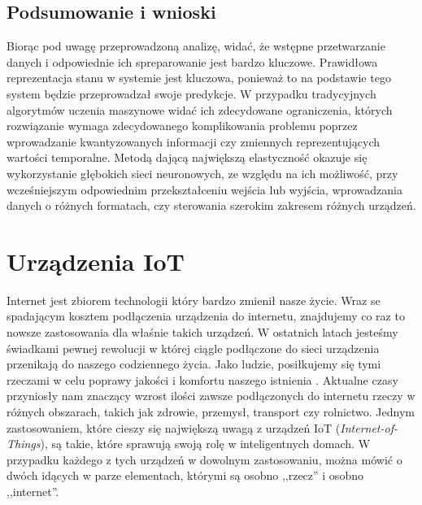 \subsection{Podsumowanie i wnioski}
Biorąc pod uwagę przeprowadzoną analizę, widać, że wstępne przetwarzanie danych i odpowiednie ich spreparowanie jest bardzo kluczowe. Prawidłowa reprezentacja stanu w systemie jest kluczowa, ponieważ to na podstawie tego system będzie przeprowadzał swoje predykcje. W przypadku tradycyjnych algorytmów uczenia maszynowe widać ich zdecydowane ograniczenia, których rozwiązanie wymaga zdecydowanego komplikowania problemu poprzez wprowadzanie kwantyzowanych informacji czy zmiennych reprezentujących wartości temporalne. Metodą dającą największą elastyczność okazuje się wykorzystanie głębokich sieci neuronowych, ze względu na ich możliwość, przy wcześniejszym odpowiednim przekształceniu wejścia lub wyjścia, wprowadzania danych o różnych formatach, czy sterowania szerokim zakresem różnych urządzeń.

\section{Urządzenia IoT}



Internet jest zbiorem technologii który bardzo zmienił nasze życie. Wraz se spadającym kosztem podłączenia urządzenia do internetu, znajdujemy co raz to nowsze zastosowania dla właśnie takich urządzeń. W ostatnich latach jesteśmy świadkami pewnej rewolucji w której ciągle podłączone do sieci urządzenia przenikają do naszego codziennego życia. Jako ludzie, posiłkujemy się tymi rzeczami w celu poprawy jakości i komfortu naszego istnienia \cite{iot_improves_lifes}. Aktualne czasy przyniosły nam znaczący wzrost ilości zawsze podłączonych do internetu rzeczy w różnych obszarach, takich jak zdrowie, przemysł, transport czy rolnictwo. Jednym zastosowaniem, które cieszy się największą uwagą z urządzeń IoT (\textit{Internet-of-Things}), są takie, które sprawują swoją rolę w inteligentnych domach. W przypadku każdego z tych urządzeń w dowolnym zastosowaniu, można mówić o dwóch idących w parze elementach, którymi są osobno ,,rzecz'' i osobno ,,internet''.

